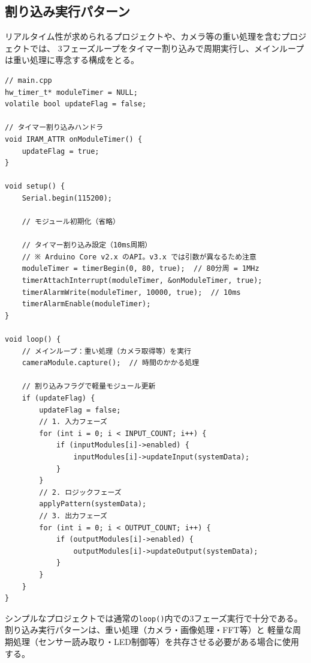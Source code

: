 \subsection{割り込み実行パターン}

リアルタイム性が求められるプロジェクトや、カメラ等の重い処理を含むプロジェクトでは、
3フェーズループをタイマー割り込みで周期実行し、メインループは重い処理に専念する構成をとる。

\begin{lstlisting}[style=cppstyle, caption={タイマー割り込みによる3フェーズ実行（ESP32の例）}]
// main.cpp
hw_timer_t* moduleTimer = NULL;
volatile bool updateFlag = false;

// タイマー割り込みハンドラ
void IRAM_ATTR onModuleTimer() {
    updateFlag = true;
}

void setup() {
    Serial.begin(115200);

    // モジュール初期化（省略）

    // タイマー割り込み設定（10ms周期）
    // ※ Arduino Core v2.x のAPI。v3.x では引数が異なるため注意
    moduleTimer = timerBegin(0, 80, true);  // 80分周 = 1MHz
    timerAttachInterrupt(moduleTimer, &onModuleTimer, true);
    timerAlarmWrite(moduleTimer, 10000, true);  // 10ms
    timerAlarmEnable(moduleTimer);
}

void loop() {
    // メインループ：重い処理（カメラ取得等）を実行
    cameraModule.capture();  // 時間のかかる処理

    // 割り込みフラグで軽量モジュール更新
    if (updateFlag) {
        updateFlag = false;
        // 1. 入力フェーズ
        for (int i = 0; i < INPUT_COUNT; i++) {
            if (inputModules[i]->enabled) {
                inputModules[i]->updateInput(systemData);
            }
        }
        // 2. ロジックフェーズ
        applyPattern(systemData);
        // 3. 出力フェーズ
        for (int i = 0; i < OUTPUT_COUNT; i++) {
            if (outputModules[i]->enabled) {
                outputModules[i]->updateOutput(systemData);
            }
        }
    }
}
\end{lstlisting}

\begin{notebox}[割り込み実行パターンの使い分け]
シンプルなプロジェクトでは通常の\texttt{loop()}内での3フェーズ実行で十分である。\\
割り込み実行パターンは、重い処理（カメラ・画像処理・FFT等）と
軽量な周期処理（センサー読み取り・LED制御等）を共存させる必要がある場合に使用する。
\end{notebox}

